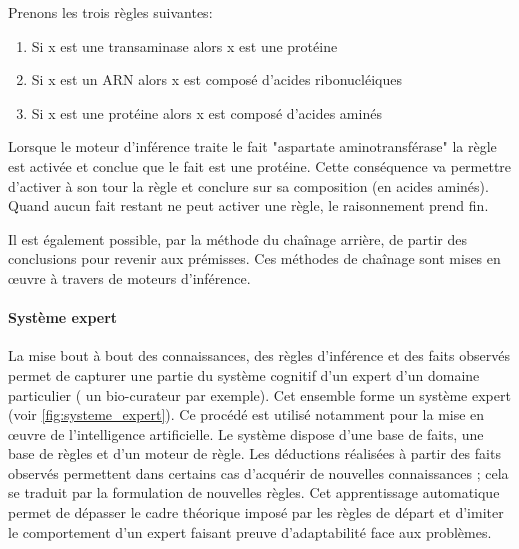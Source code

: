 \begin{refsegment}
    Prenons les trois règles suivantes:\nolisttopbreak    
    \begin{enumerate}
        \item Si x est une transaminase alors x est une protéine
        \item Si x est un ARN alors x est composé d'acides ribonucléiques
        \item Si x est une protéine alors x est composé d'acides aminés
    \end{enumerate}

    Lorsque le moteur d'inférence traite le fait "aspartate aminotransférase" la règle  est activée et  conclue que le fait est une protéine. Cette conséquence va permettre d'activer à son tour la règle  et conclure sur sa composition (en acides aminés). Quand aucun fait restant ne peut activer une règle, le raisonnement prend fin.
    
    Il est également possible, par la méthode du chaînage arrière, de partir des conclusions pour revenir aux prémisses. Ces méthodes de chaînage sont mises en œuvre à travers de moteurs d'inférence.
    
    \paragraph{Système expert}
    La mise bout à bout des connaissances, des règles d'inférence et des faits observés permet de capturer une partie du système cognitif d'un expert d'un domaine particulier ( un bio-curateur par exemple). Cet ensemble forme un système expert (voir \cref{fig:systeme_expert}). Ce procédé est utilisé notamment pour la mise en œuvre de l'intelligence artificielle. Le système dispose d'une base de faits, une base de règles et d'un moteur de règle. Les déductions réalisées à partir des faits observés permettent dans certains cas d'acquérir de nouvelles connaissances ; cela se traduit par la formulation de nouvelles règles. Cet apprentissage automatique permet de dépasser le cadre théorique imposé par les règles de départ et d'imiter le comportement d'un expert faisant preuve d'adaptabilité face aux problèmes.
    

\end{refsegment}

